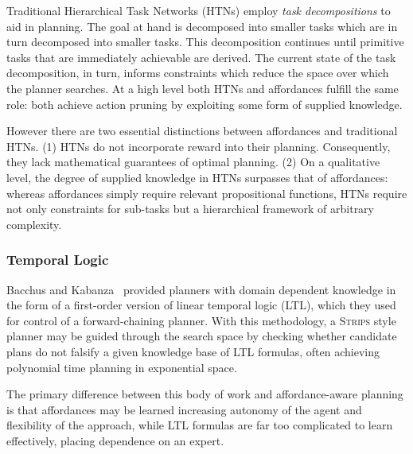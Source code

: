 \documentclass[conference]{IEEEtran}
\newcommand{\enote}[1]{\textcolor{Red}{\textbf{}}}
\begin{document}
Traditional Hierarchical Task Networks (HTNs) employ \textit{task decompositions} to aid in planning. The goal at hand is decomposed into smaller tasks which are in turn decomposed into smaller tasks. This decomposition continues until primitive tasks that are immediately achievable are derived. The current state of the task decomposition, in turn, informs constraints which reduce the space over which the planner searches. At a high level both HTNs and affordances fulfill the same role: both achieve action pruning by exploiting some form of supplied knowledge. 

However there are two essential distinctions between affordances and traditional HTNs.  (1) HTNs do not incorporate reward into their planning. Consequently, they lack mathematical guarantees of optimal planning. (2) On a qualitative level, the degree of supplied knowledge in HTNs surpasses that of affordances: whereas affordances simply require relevant propositional functions, HTNs require not only constraints for sub-tasks but a hierarchical framework of arbitrary complexity. \enote{Need citations for HTNs}

\subsubsection{Temporal Logic}

Bacchus and Kabanza~\cite{Bacchus95usingtemporal,Bacchus99usingtemporal} provided
planners with domain dependent knowledge in the form of a first-order version of linear
temporal logic (LTL), which they used for control of a forward-chaining planner. With this methodology, 
a \textsc{Strips} style planner may be guided through the search space by checking 
whether candidate plans do not falsify a given knowledge base of LTL formulas, often
achieving polynomial time planning in exponential space.

\enote{Maybe add how LTL is similar to what we are doing?}

The primary difference between this body of work and affordance-aware planning is that
affordances may be learned increasing autonomy of the agent and flexibility of the approach, while LTL formulas are far
too complicated to learn effectively, placing dependence on an expert.

\end{document}
